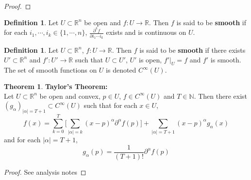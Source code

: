 \documentclass{book}
\theoremstyle{definition}
\newtheorem{defn}[definition]{Definition}
\newtheorem{thm}[definition]{Theorem}
\newcommand{\al}{\alpha}
\newcommand{\N}{\mathbb{N}}
\newcommand{\R}{\mathbb{R}}
\newcommand{\ld}[1]{\label{defn:#1}}
\DeclareMathOperator*{\0}{\mbf{0}}
\DeclareMathOperator*{\1}{\mbf{1}}
\newcommand{\tbf}[1]{\textbf{#1}}
\newcommand{\p}{\partial}
\begin{document}
	\begin{proof}
		
	\end{proof}

	\begin{defn} \ld{21004}
		Let $U \subset \R^n$ be open and $f: U \rightarrow \R$. Then $f$ is said to be \tbf{smooth} if for each $i_1, \cdots, i_k \in \{1, \cdots, n\}$, $\frac{\partial^k f}{\partial i_1 \cdots i_k}$ exists and is continuous on $U$.
	\end{defn}

	\begin{defn} \ld{21005}
		Let $U \subset \R^n$, $f: U \rightarrow \R$. Then $f$ is said to be \tbf{smooth} if there exists $U' 
		\subset \R^n$ and $f':U' \rightarrow \R$ such that $U \subset U'$, $U'$ is open, $f'|_U = f$ and $f'$ is smooth. The set of smooth functions on $U$ is denoted $C^{\infty}(U)$.
	\end{defn}


	\begin{thm} \tbf{Taylor's Theorem:}\\ 
		Let $U \subset \R^n$ be open and convex, $p \in U$, $f \in C^{\infty}(U)$ and $T \in \N$. Then there exist $(g_{\al})_{|\al| = T+1} \subset C^{\infty}(U)$ such that for each $x \in U$, 
		$$f(x) = \sum_{k=0}^{T} \bigg[\sum_{|\al| = k}(x - p)^{\al} \p^{\al} f (p) \bigg] + \sum_{|\al| = T+1}(x - p)^{\al} g_{\al}(x)$$ and for each $|\al|= T+1$, $$g_{\al}(p) = \frac{1}{(T+1)!}\p^{\al} f(p)$$
	\end{thm}
	
	\begin{proof}
	See analysis notes
	\end{proof}

\end{document}
